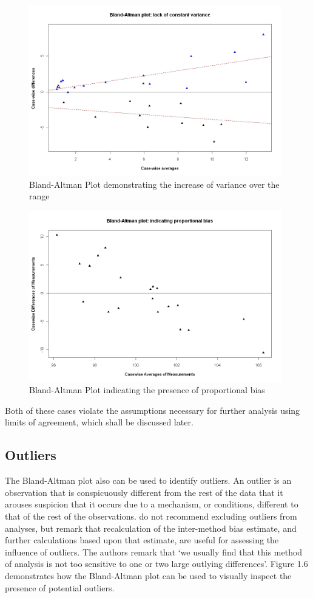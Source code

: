 \documentclass[12pt, a4paper]{report}
\theoremstyle{plain}
\theoremstyle{definition}
\theoremstyle{remark}
\begin{document}
	\begin{figure}[h!]
		\begin{center}
			\includegraphics[width=110mm]{images/BAFanEffect.jpeg}
			\caption{Bland-Altman Plot demonstrating the increase of variance over the range}\label{BAFanEffect}
		\end{center}
	\end{figure}
	
	\begin{figure}[h!]
		\begin{center}
			\includegraphics[width=110mm]{images/PropBias.jpeg}
			\caption{Bland-Altman Plot indicating the presence of proportional bias}\label{PropBias}
		\end{center}
	\end{figure}
Both of these cases violate the assumptions necessary for further analysis using limits of agreement, which shall be discussed later. 

\subsection{Outliers}
The Bland-Altman plot also can be used to identify outliers. An outlier is an observation that is conspicuously different from the rest of the data that it arouses suspicion that it occurs due to a mechanism, or conditions, different to that of the rest of the observations. \citet*{BA99} do not recommend excluding outliers from analyses,
but remark that recalculation of the inter-method bias estimate,
and further calculations based upon that estimate, are useful for
assessing the influence of outliers. The authors remark that `we
usually find that this method of analysis is not too sensitive to
one or two large outlying differences'. Figure 1.6 demonstrates how the Bland-Altman plot can be used to visually inspect the presence of potential outliers.
\end{document}
